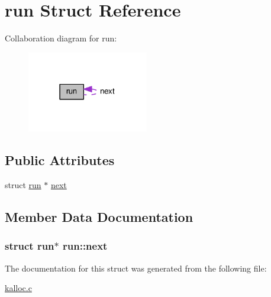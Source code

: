 \hypertarget{structrun}{}\section{run Struct Reference}
\label{structrun}


Collaboration diagram for run\+:\nopagebreak
\begin{figure}[H]
\begin{center}
\leavevmode
\includegraphics[width=150pt]{dc/dde/structrun__coll__graph}
\end{center}
\end{figure}
\subsection*{Public Attributes}
\begin{DoxyCompactItemize}
\item 
struct \hyperlink{structrun}{run} $\ast$ \hyperlink{structrun_a268099adb9e6c607cd814a421a1c8a18}{next}
\end{DoxyCompactItemize}


\subsection{Member Data Documentation}
\subsubsection[{\texorpdfstring{next}{next}}]{\setlength{\rightskip}{0pt plus 5cm}struct {\bf run}$\ast$ run\+::next}\hypertarget{structrun_a268099adb9e6c607cd814a421a1c8a18}{}\label{structrun_a268099adb9e6c607cd814a421a1c8a18}


The documentation for this struct was generated from the following file\+:\begin{DoxyCompactItemize}
\item 
\hyperlink{kalloc_8c}{kalloc.\+c}\end{DoxyCompactItemize}
